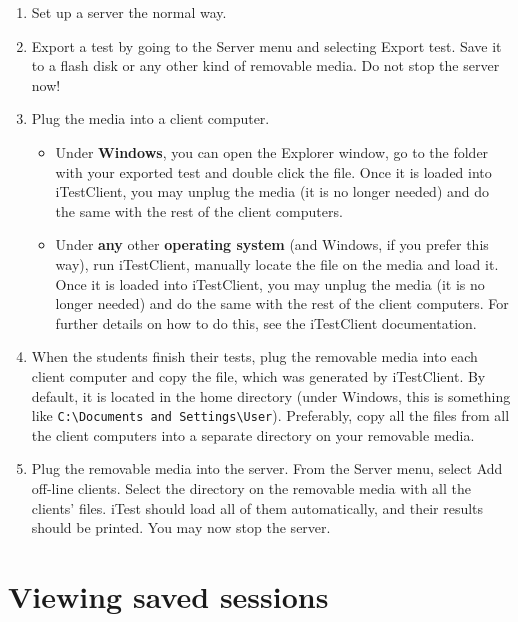 \begin{enumerate}
\item Set up a server the normal way.

\item Export a test by going to the Server menu and selecting Export test.
Save it to a flash disk or any other kind of removable media.
Do not stop the server now!

\item Plug the media into a client computer.

\begin{itemize}
\item Under {\bf Windows}, you can open the Explorer window, go to the folder with your exported test and double click the file.
Once it is loaded into iTestClient, you may unplug the media (it is no longer needed) and do the same with the rest of the client computers.

\item Under {\bf any} other {\bf operating system} (and Windows, if you prefer this way), run iTestClient, manually locate the file on the media and load it.
Once it is loaded into iTestClient, you may unplug the media (it is no longer needed) and do the same with the rest of the client computers.
For further details on how to do this, see the iTestClient documentation.
\end{itemize}

\item When the students finish their tests, plug the removable media into each client computer and copy the file, which was generated by iTestClient.
By default, it is located in the home directory (under Windows, this is something like {\tt C:\textbackslash{}Documents and Settings\textbackslash{}User}).
Preferably, copy all the files from all the client computers into a separate directory on your removable media.

\item Plug the removable media into the server.
From the Server menu, select Add off-line clients.
Select the directory on the removable media with all the clients' files.
iTest should load all of them automatically, and their results should be printed.
You may now stop the server.
\end{enumerate}

\section{Viewing saved sessions}

